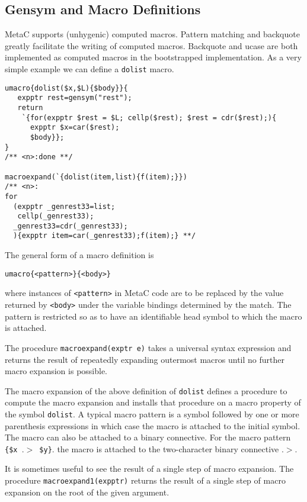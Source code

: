 \documentclass{article}
\begin{document}
\subsection{Gensym and Macro Definitions}

MetaC supports (unhygenic) computed macros.  Pattern matching and backquote greatly facilitate the writing of computed macros.  Backquote and ucase are both implemented as computed macros in the bootstrapped implementation. As a very simple example we can define a {\tt dolist} macro.

\begin{verbatim}
umacro{dolist($x,$L){$body}}{
   expptr rest=gensym("rest");
   return
    `{for(expptr $rest = $L; cellp($rest); $rest = cdr($rest);){
      expptr $x=car($rest);
      $body}};
}
/** <n>:done **/

macroexpand(`{dolist(item,list){f(item);}})
/** <n>:
for
  (expptr _genrest33=list;
   cellp(_genrest33);
  _genrest33=cdr(_genrest33);
  ){expptr item=car(_genrest33);f(item);} **/
\end{verbatim}

The general form of a macro definition is
\begin{verbatim}
umacro{<pattern>}{<body>}
\end{verbatim}
where instances of {\tt <pattern>} in MetaC code are to be replaced by
the value returned by {\tt <body>} under the variable bindings
determined by the match.  The pattern is restricted so as to have
an identifiable head symbol to which the macro is attached.

The procedure {\tt macroexpand(exptr e)} takes a
universal syntax expression and returns the result of repeatedly
expanding outermost macros until no further macro expansion is
possible.

The macro expansion of the above definition of {\tt dolist}
defines a procedure
to compute the macro expansion and installs that procedure on a macro
property of the symbol {\tt dolist}.  A typical macro pattern
is a symbol followed by one or more parenthesis
expressions in which case the macro is attached to the initial symbol.
The macro can also be attached to a binary connective.
For the macro pattern {\tt \{\$x $.\!>$ \$y\}}.
the macro is attached to the two-character binary connective $.\!>$.

It is sometimes useful to see the result of a single step
of macro expansion. The procedure {\tt macroexpand1(expptr)} returns
the result of a single step of macro expansion on the root of the given argument.
\end{document}
